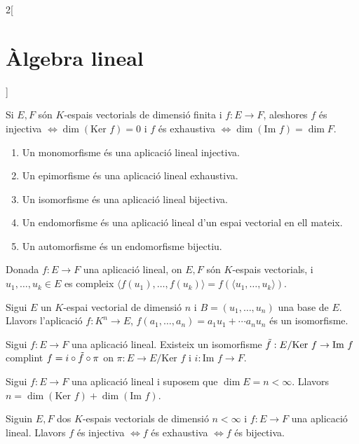 \documentclass[class=article,10pt,crop=false]{standalone}
\begin{document}
\begin{multicols}{2}[\section{Àlgebra lineal}]
\begin{prop}
\begin{enumerate}
\end{enumerate}
\end{prop}
\begin{prop}
Si $E,F$ són $K$-espais vectorials de dimensió finita i $f:E\rightarrow F$, aleshores $f$ és injectiva $\iff \dim(\text{Ker }f)=0$ i $f$ és exhaustiva $\iff \dim(\text{Im }f)=\dim F$.
\end{prop}
\begin{definition}
\hfill
\begin{enumerate}
    \item Un monomorfisme és una aplicació lineal injectiva.
    \item Un epimorfisme és una aplicació lineal exhaustiva.
    \item Un isomorfisme és una aplicació lineal bijectiva.
    \item Un endomorfisme és una aplicació lineal d'un espai vectorial en ell mateix.
    \item Un automorfisme és un endomorfisme bijectiu.
\end{enumerate}
\end{definition}
\begin{lemma}
Donada $f:E\rightarrow F$ una aplicació lineal, on $E,F$ són $K$-espais vectorials, i $u_1,\ldots,u_k\in E$ es compleix $\langle f(u_1),\ldots,f(u_k)\rangle=f(\langle u_1,\ldots,u_k\rangle)$.
\end{lemma}
\begin{theorem}
Sigui $E$ un $K$-espai vectorial  de dimensió $n$ i $B=(u_1,\ldots,u_n)$ una base de $E$. Llavors l'aplicació $f:K^n\rightarrow E$, $f(a_1,\ldots,a_n)=a_1u_1+\cdots a_nu_n$ és un isomorfisme.
\end{theorem}
\begin{theorem}
Sigui $f:E\rightarrow F$ una aplicació lineal. Existeix un isomorfisme $\Tilde{f}:E/\text{Ker }f\rightarrow \text{Im }f$ complint $f=i\circ\Tilde{f}\circ\pi$ on $\pi:E\rightarrow E/\text{Ker }f$ i $i:\text{Im }f\rightarrow F$.
\end{theorem}
\begin{corollary}
Sigui $f:E\rightarrow F$ una aplicació lineal i suposem que $\dim E=n<\infty$. Llavors $n=\dim(\text{Ker }f)+\dim(\text{Im }f)$.
\end{corollary}
\begin{corollary}
Siguin $E,F$ dos $K$-espais vectorials de dimensió $n<\infty$ i $f:E\rightarrow F$ una aplicació lineal. Llavors $f$ és injectiva $\iff f$ és exhaustiva $\iff f$ és bijectiva.

\end{corollary}
\end{multicols}
\end{document}
